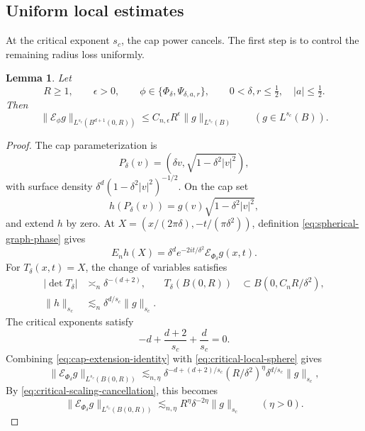 \documentclass[11pt]{article}
\numberwithin{equation}{section}
\newtheorem{lemma}[theorem]{Lemma}
\newcommand{\norm}[1]{\lVert #1\rVert}
\newcommand{\abs}[1]{\lvert #1\rvert}
\begin{document}
\subsection{Uniform local estimates}

At the critical exponent \(s_c\), the cap power cancels. The first
step is to control the remaining radius loss uniformly.

\begin{lemma}\label{lem:uniform-local-graphs}
Let
\[
 R\ge1,\qquad\epsilon>0,\qquad
 \phi\in\{\Phi_\delta,\Psi_{\delta,a,r}\},\qquad
 0<\delta,r\le\tfrac12,\quad |a|\le\tfrac12.
\]
Then
\[
 \norm{\mathcal E_\phi g}_{L^{s_c}(B^{d+1}(0,R))}
 \le C_{n,\epsilon}R^\epsilon\norm{g}_{L^{s_c}(B)}
 \qquad(g\in L^{s_c}(B)).
\]
\end{lemma}

\begin{proof}
The cap parameterization is
\[
 P_\delta(v)=(\delta v,\sqrt{1-\delta^2\abs v^2}),
\]
with surface density \(\delta^d(1-\delta^2\abs v^2)^{-1/2}\).
On the cap set
\[
 h(P_\delta(v))=g(v)\sqrt{1-\delta^2\abs v^2},
\]
and extend \(h\) by zero. At
\(X=(x/(2\pi\delta),-t/(\pi\delta^2))\), definition
\eqref{eq:spherical-graph-phase} gives
\begin{equation}\label{eq:cap-extension-identity}
 E_n h(X)=\delta^d e^{-2it/\delta^2}\mathcal E_{\Phi_\delta}g(x,t).
\end{equation}
For \(T_\delta(x,t)=X\), the change of variables satisfies
\begin{align*}
 |\det T_\delta|&\asymp_n\delta^{-(d+2)},&
 T_\delta(B(0,R))&\subset B(0,C_nR/\delta^2),\\
 \norm h_{s_c}&\lesssim_n\delta^{d/s_c}\norm g_{s_c}.
\end{align*}
The critical exponents satisfy
\begin{equation}\label{eq:critical-scaling-cancellation}
 -d+\frac{d+2}{s_c}+\frac d{s_c}=0.
\end{equation}
Combining \eqref{eq:cap-extension-identity} with
\eqref{eq:critical-local-sphere} gives
\[
 \norm{\mathcal E_{\Phi_\delta}g}_{L^{s_c}(B(0,R))}
 \lesssim_{n,\eta}
 \delta^{-d+(d+2)/s_c}(R/\delta^2)^\eta
 \delta^{d/s_c}\norm g_{s_c},
\]
By \eqref{eq:critical-scaling-cancellation}, this becomes
\begin{equation}\label{eq:cap-local-with-loss}
 \norm{\mathcal E_{\Phi_\delta}g}_{L^{s_c}(B(0,R))}
 \lesssim_{n,\eta} R^\eta\delta^{-2\eta}\norm{g}_{s_c}
 \qquad (\eta>0).
\end{equation}


\end{proof}
\end{document}
